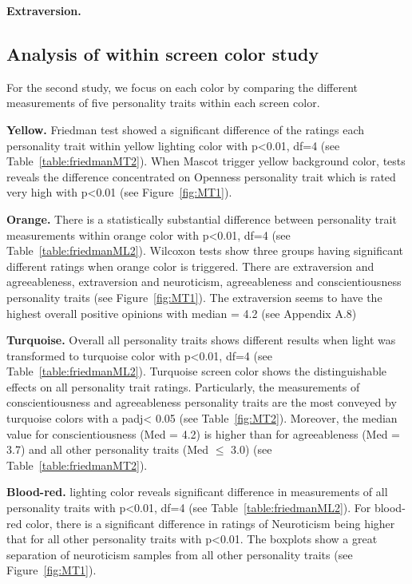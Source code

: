 \par\textbf{Extraversion.}

\subsection{Analysis of within screen color study}
\label{subsec:MTstudy2}
For the second study, we focus on each color by comparing the different measurements of five
personality traits within each screen color.

\par\textbf{Yellow.}
Friedman test showed a significant difference of the ratings each personality trait
within yellow lighting color with p<0.01, df=4 (see Table~\ref{table:friedmanMT2}).
When Mascot trigger yellow background color, tests reveals the difference concentrated on Openness
personality trait which is rated very high with p<0.01 (see Figure~\ref{fig:MT1}).

\par\textbf{Orange.}
There is a statistically substantial difference between personality trait measurements within
orange color with p<0.01, df=4 (see Table~\ref{table:friedmanML2}).
Wilcoxon tests show three groups having significant different ratings when orange
color is triggered.
There are extraversion and agreeableness, extraversion and neuroticism, agreeableness and
conscientiousness personality traits (see Figure~\ref{fig:MT1}).
The extraversion seems to have the highest overall positive opinions
with median = 4.2 (see Appendix A.8)

\par\textbf{Turquoise.}
Overall all personality traits shows different results when light was transformed to turquoise color
with p<0.01, df=4 (see Table~\ref{table:friedmanML2}).
Turquoise screen color shows the distinguishable effects on all personality trait ratings.
Particularly, the measurements of conscientiousness and agreeableness personality traits are the most
conveyed by turquoise colors with a padj< 0.05 (see Table~\ref{fig:MT2}).
Moreover, the median value for conscientiousness (Med = 4.2) is higher than for agreeableness
(Med = 3.7) and all other personality traits (Med $\leq$ 3.0) (see Table~\ref{table:friedmanMT2}).

\par\textbf{Blood-red.}
lighting color reveals significant difference in measurements of all personality traits
with p<0.01, df=4 (see Table~\ref{table:friedmanML2}).
For blood-red color, there is a significant difference in ratings of Neuroticism
being higher that for all other personality traits with p<0.01.
The boxplots show a great separation of neuroticism samples from all
other personality traits (see Figure~\ref{fig:MT1}).


